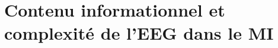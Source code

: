 
\clearpage
\section{Contenu informationnel et complexité de l'EEG dans le MI}
\label{contenuinformationnel}

